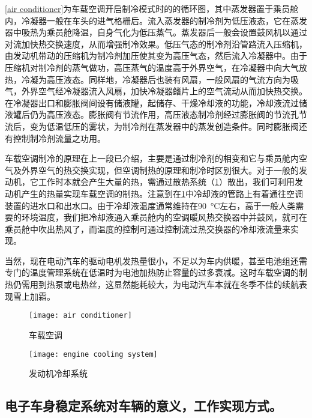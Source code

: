 \documentclass[UTF8]{ctexart}
\numberwithin{figure}{section}
\numberwithin{table}{section}
\begin{document}
\cref{air conditioner}为车载空调开启制冷模式时的的循环图，其中蒸发器置于乘员舱内，冷凝器一般在车头的进气格栅后。流入蒸发器的制冷剂为低压液态，它在蒸发器中吸热为乘员舱降温，自身气化为低压蒸气。蒸发器后一般会设置鼓风机以通过对流加快热交换速度，从而增强制冷效果。低压气态的制冷剂沿管路流入压缩机，由发动机带动的压缩机为制冷剂加压使其变为高压气态，然后流入冷凝器中。由于压缩机对制冷剂的蒸气做功，高压蒸气的温度高于外界空气，在冷凝器中向大气放热，冷凝为高压液态。同样地，冷凝器后也装有风扇，一般风扇的气流方向为吸气，外界空气经冷凝器流入风扇，加快冷凝器鳍片上的空气流动从而加快热交换。在冷凝器出口和膨胀阀间设有储液罐，起储存、干燥冷却液的功能，冷却液流过储液罐后仍为高压液态。膨胀阀有节流作用，高压液态制冷剂经过膨胀阀的节流孔节流后，变为低温低压的雾状，为制冷剂在蒸发器中的蒸发创造条件。同时膨胀阀还有控制制冷剂流量之功用。

车载空调制冷的原理在上一段已介绍，主要是通过制冷剂的相变和它与乘员舱内空气及外界空气的热交换实现，但空调制热的原理和制冷时区别很大。对于一般的发动机，它工作时本就会产生大量的热，需通过散热系统（\cref{engine cooling system}）散出，我们可利用发动机产生的热量实现车载空调的制热。注意到在\cref{engine cooling system}中冷却液的管路上有着通往空调装置的进水口和出水口。由于冷却液温度通常维持在\SI{90}{\celsius}左右，高于一般人类需要的环境温度，我们把冷却液通入乘员舱内的空调暖风热交换器中并鼓风，就可在乘员舱中吹出热风了，而温度的控制可通过控制流过热交换器的冷却液流量来实现。

当然，现在电动汽车的驱动电机发热量很小，不足以为车内供暖，甚至电池组还需专门的温度管理系统在低温时为电池加热防止容量的过多衰减。这时车载空调的制热仍需用到热泵或电热丝，这显然能耗较大，为电动汽车本就在冬季不佳的续航表现雪上加霜。

\begin{figure}[htbp]
	\centering
	\begin{minipage}[b]{0.8\textwidth}
		\centering
		\texttt{[image: air conditioner]}
		\caption{车载空调}
		\label{air conditioner}
	\end{minipage}
	\begin{minipage}[b]{\textwidth}
		\centering
		\texttt{[image: engine cooling system]}
		\caption{发动机冷却系统}
		\label{engine cooling system}
	\end{minipage}
\end{figure}

\subsection{电子车身稳定系统对车辆的意义，工作实现方式。}
\end{document}

